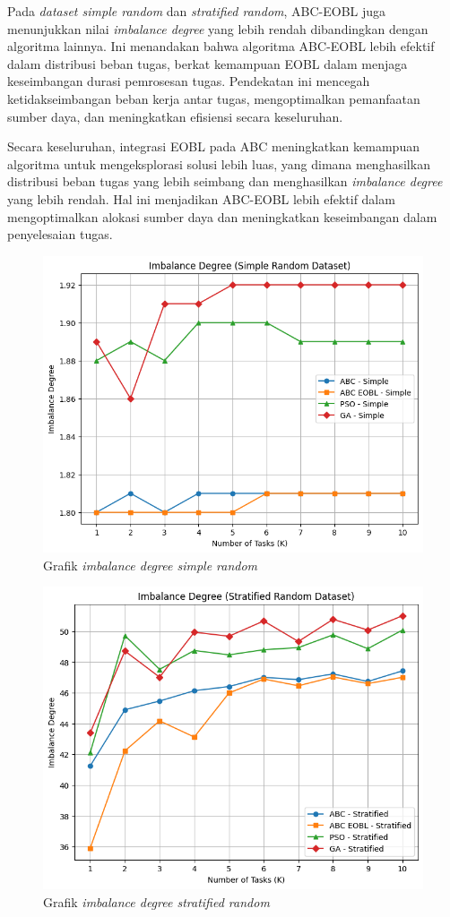 Pada \textit{dataset simple random} dan \textit{stratified random}, ABC-EOBL juga menunjukkan nilai \textit{imbalance degree} yang lebih rendah dibandingkan dengan algoritma lainnya. Ini menandakan bahwa algoritma ABC-EOBL lebih efektif dalam distribusi beban tugas, berkat kemampuan EOBL dalam menjaga keseimbangan durasi pemrosesan tugas. Pendekatan ini mencegah ketidakseimbangan beban kerja antar tugas, mengoptimalkan pemanfaatan sumber daya, dan meningkatkan efisiensi secara keseluruhan.

Secara keseluruhan, integrasi EOBL pada ABC meningkatkan kemampuan algoritma untuk mengeksplorasi solusi lebih luas, yang dimana menghasilkan distribusi beban tugas yang lebih seimbang dan menghasilkan \textit{imbalance degree} yang lebih rendah. Hal ini menjadikan ABC-EOBL lebih efektif dalam mengoptimalkan alokasi sumber daya dan meningkatkan keseimbangan dalam penyelesaian tugas.

\begin{figure} [H]
    \centering
    \includegraphics[width=0.75\linewidth]{gambar/Grafik Imbalance Degree Simple Random.png}
    \caption{Grafik \textit{imbalance degree simple random}}
\end{figure}

\newpage

\begin{figure} [H]
    \centering
    \includegraphics[width=0.75\linewidth]{gambar/Grafik Imbalance Degree Stratified Random.png}
    \caption{Grafik \textit{imbalance degree stratified random}}
\end{figure}

